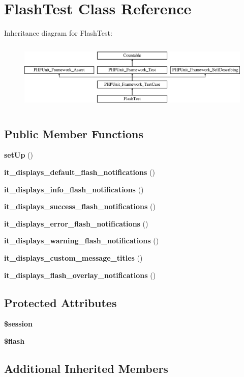 \section{Flash\+Test Class Reference}
\label{class_flash_test}
Inheritance diagram for Flash\+Test\+:\begin{figure}[H]
\begin{center}
\leavevmode
\includegraphics[height=3.303835cm]{class_flash_test}
\end{center}
\end{figure}
\subsection*{Public Member Functions}
\begin{DoxyCompactItemize}
\item 
{\bf set\+Up} ()
\item 
{\bf it\+\_\+displays\+\_\+default\+\_\+flash\+\_\+notifications} ()
\item 
{\bf it\+\_\+displays\+\_\+info\+\_\+flash\+\_\+notifications} ()
\item 
{\bf it\+\_\+displays\+\_\+success\+\_\+flash\+\_\+notifications} ()
\item 
{\bf it\+\_\+displays\+\_\+error\+\_\+flash\+\_\+notifications} ()
\item 
{\bf it\+\_\+displays\+\_\+warning\+\_\+flash\+\_\+notifications} ()
\item 
{\bf it\+\_\+displays\+\_\+custom\+\_\+message\+\_\+titles} ()
\item 
{\bf it\+\_\+displays\+\_\+flash\+\_\+overlay\+\_\+notifications} ()
\end{DoxyCompactItemize}
\subsection*{Protected Attributes}
\begin{DoxyCompactItemize}
\item 
{\bf \$session}
\item 
{\bf \$flash}
\end{DoxyCompactItemize}
\subsection*{Additional Inherited Members}


